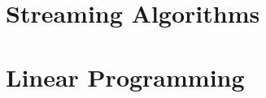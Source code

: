 \documentclass{article}
\begin{document}
\section{Streaming Algorithms}

%        
%        
%          
%          
%        

\section{Linear Programming}
\end{document}
